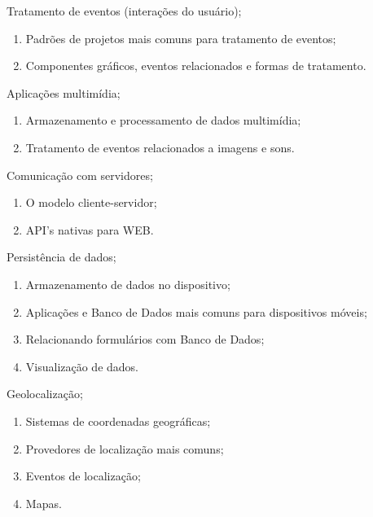 \begin{pud}
\begin{description}[itemsep=0em]
        \item[UNIDADE II:] Tratamento de eventos (interações do usuário);
	         \begin{enumerate}[itemsep=0em, topsep=0em]
				\item Padrões de projetos mais comuns para tratamento de eventos;
				\item Componentes gráficos, eventos relacionados e formas de tratamento.
            \end{enumerate}

		\item[UNIDADE III:] Aplicações multimídia; 
	         \begin{enumerate}[itemsep=0em, topsep=0em]
				\item Armazenamento e processamento de dados multimídia;
				\item Tratamento de eventos relacionados a imagens e sons.
            \end{enumerate}
            
        \item[UNIDADE IV:] Comunicação com servidores;
	         \begin{enumerate}[itemsep=0em, topsep=0em]
				\item O modelo cliente-servidor;
				\item API's nativas para WEB.
            \end{enumerate}
            
		\item[UNIDADE V:] Persistência de dados; 
	         \begin{enumerate}[itemsep=0em, topsep=0em]
				\item Armazenamento de dados no dispositivo;
                \item Aplicações e Banco de Dados mais comuns para dispositivos móveis;
                \item Relacionando formulários com Banco de Dados;
                \item Visualização de dados.
            \end{enumerate}
            
        \item[UNIDADE VI:] Geolocalização;
	         \begin{enumerate}[itemsep=0em, topsep=0em]
				\item Sistemas de coordenadas geográficas;
         		\item Provedores de localização mais comuns;
                \item Eventos de localização;
				\item Mapas.
            \end{enumerate}


\end{description}
\end{pud}
